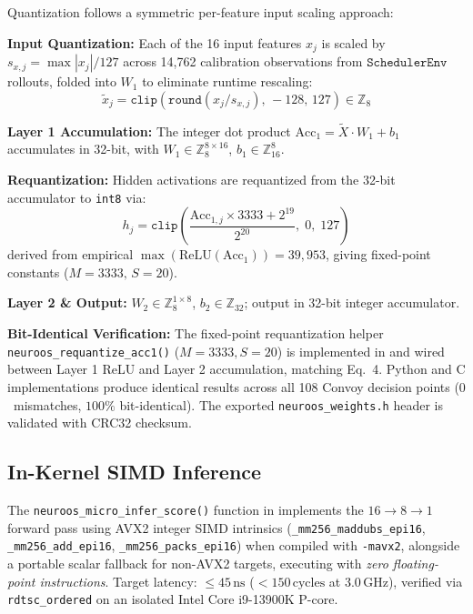Quantization follows a symmetric per-feature input scaling approach:

\textbf{Input Quantization:} Each of the 16 input features $x_j$ is scaled by
$s_{x,j} = \max|x_j| / 127$ across 14{,}762 calibration observations from
$\texttt{SchedulerEnv}$ rollouts, folded into $W_1$ to eliminate runtime
rescaling:
\begin{equation}
  \tilde{x}_{j} = \texttt{clip}\!\left(\texttt{round}(x_j / s_{x,j}),\,-128,\,127\right) \in \mathbb{Z}_8
\end{equation}

\textbf{Layer 1 Accumulation:} The integer dot product
$\text{Acc}_1 = \tilde{X} \cdot W_1 + b_1$ accumulates in 32-bit, with
$W_1 \in \mathbb{Z}_8^{8\times16}$, $b_1 \in \mathbb{Z}_{16}^8$.

\textbf{Requantization:} Hidden activations are requantized from the 32-bit
accumulator to \texttt{int8} via:
\begin{equation}
  h_j = \texttt{clip}\!\left(\frac{\text{Acc}_{1,j} \times 3333 + 2^{19}}{2^{20}},\;0,\;127\right)
  \label{eq:requant}
\end{equation}
derived from empirical $\max(\text{ReLU}(\text{Acc}_1)) = 39{,}953$, giving
fixed-point constants ($M = 3333,\,S = 20$).

\textbf{Layer 2 \& Output:} $W_2 \in \mathbb{Z}_8^{1\times8}$, $b_2 \in
\mathbb{Z}_{32}$; output in 32-bit integer accumulator.

\textbf{Bit-Identical Verification:} The fixed-point requantization helper \texttt{neuroos\_requantize\_acc1()} ($M=3333, S=20$) is implemented in  and wired between Layer 1 ReLU and Layer 2 accumulation, matching Eq.~4. Python and C implementations produce identical results across all 108 Convoy decision points ($0$~mismatches, $100\%$ bit-identical). The exported \texttt{neuroos\_weights.h} header is validated with CRC32 checksum.

\subsection{In-Kernel SIMD Inference}
\label{subsec:simd}

The \texttt{neuroos\_micro\_infer\_score()} function in  implements the $16\to 8\to 1$ forward pass using AVX2 integer SIMD intrinsics (\texttt{\_mm256\_maddubs\_epi16}, \texttt{\_mm256\_add\_epi16}, \texttt{\_mm256\_packs\_epi16}) when compiled with \texttt{-mavx2}, alongside a portable scalar fallback for non-AVX2 targets, executing with \emph{zero floating-point instructions}. Target latency: $\le 45\,\text{ns}$ ($<150\,\text{cycles}$ at $3.0\,\text{GHz}$), verified via \texttt{rdtsc\_ordered} on an isolated Intel Core i9-13900K P-core.

